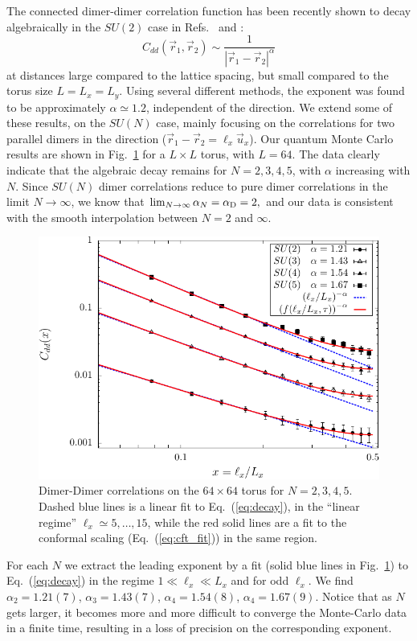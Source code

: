 \documentclass[11pt]{iopart}
\begin{document}
The connected dimer-dimer correlation function has been recently shown to decay algebraically in the $SU(2)$ case in Refs.~\cite{RVB1} and \cite{RVB2}:
\begin{equation}\label{eq:decay}
 C_{dd}(\vec{r}_1,\vec{r}_2)\sim \frac{1}{\left|\vec{r}_1-\vec{r}_2\right|^\alpha}
\end{equation}
at distances large compared to the lattice spacing, but small compared to the torus size $L=L_x=L_y$. Using several different methods, the exponent was found to be approximately $\alpha \simeq 1.2$, independent of the direction.
We extend some of these results, on the $SU(N)$ case, mainly focusing on the correlations for two parallel dimers in the direction ($\vec{r}_1-\vec{r}_2=\ell_x \vec{u}_x$). 
Our quantum Monte Carlo results are shown in Fig.~\ref{fig:corr_su2_dimers} for a $L\times L$ torus, with $L=64$. The data clearly indicate that the algebraic decay remains for $N=2,3,4,5$, with $\alpha$ increasing with $N$. 
Since $SU(N)$ dimer correlations reduce to pure dimer correlations in the limit $N\to\infty$, we know that
$
 \lim_{N \to \infty} \alpha_N=\alpha_{\rm D}=2,
$
 and our data is consistent with the smooth interpolation between $N=2$ and $\infty$. \begin{figure}[ht]
 \begin{center}
  \includegraphics[scale=0.8]{./figures/corr_su2.pdf}
 \end{center}
\caption{Dimer-Dimer correlations on the $64 \times 64$ torus for $N=2,3,4,5$. Dashed blue lines is a linear fit to Eq.~(\ref{eq:decay}), in the ``linear regime'' $\ell_x \simeq 5,\ldots,15$, while the red solid lines are a fit to the conformal scaling (Eq.~(\ref{eq:cft_fit})) in the same region.}
\label{fig:corr_su2_dimers}
\end{figure}
For each $N$ we extract the leading exponent by a fit (solid blue lines in Fig.~\ref{fig:corr_su2_dimers}) to Eq.~(\ref{eq:decay}) in the regime $1\ll \ell_x \ll L_x$ and for odd $\ell_x$. We find $\alpha_2=1.21(7)$, $\alpha_3=1.43(7)$, $\alpha_4=1.54(8)$, $\alpha_4=1.67(9)$. Notice that as $N$ gets larger, it becomes more and more difficult to converge the Monte-Carlo data in a finite time, resulting in a loss of precision on the corresponding exponent. 
\end{document}
